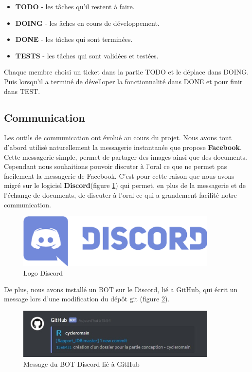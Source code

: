 \begin{itemize}
\item \textbf{TODO} - les t\^aches qu'il restent à faire. 
\item \textbf{DOING} - les \^aches en cours de développement.
\item \textbf{DONE} - les t\^aches qui sont terminées.
\item \textbf{TESTS} - les t\^aches qui sont validées et testées.\\
\end{itemize}

Chaque membre choisi un ticket dans la partie TODO et le déplace dans DOING. Puis lorsqu'il a terminé de dévelloper la fonctionnalité dans DONE et pour finir dans TEST.



\subsection{Communication}
Les outils de communication ont évolué au cours du projet. Nous avons tout d'abord utilisé naturellement la messagerie instantanée que propose \textbf{Facebook}. Cette messagerie simple, permet de partager des images ainsi que des documents.
Cependant nous souhaitions pouvoir discuter à l'oral ce que ne permet pas facilement la messagerie de Facebook. C'est pour cette raison que nous avons migré sur le logiciel \textbf{Discord}(figure \ref{discord_logo}) qui permet, en plus de la messagerie et de l'échange de documents, de discuter à l'oral ce qui a grandement facilité notre communication.

\begin{figure}[!h]
\centering
\includegraphics[width=10cm]{./images/activite/discordLogo.eps}
\caption{Logo Discord}
\label{discord_logo}
\end{figure}

De plus, nous avons installé un BOT sur le Discord, lié a GitHub, qui écrit un message lors d'une modification du dép\^ot git (figure \ref{bot_discord}).

\begin{figure}[!h]
\centering
\includegraphics[width=10cm]{./images/activite/bot_discord.eps}
\caption{Message du BOT Discord lié à GitHub}
\label{bot_discord}
\end{figure}



